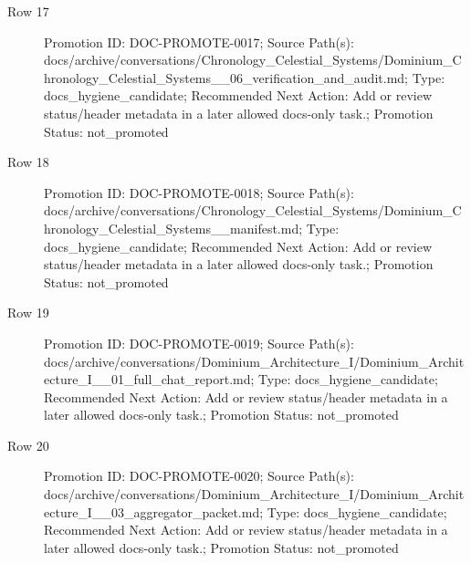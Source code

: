 \documentclass[9pt,a4paper,openany]{book}
\begin{document}
\begin{description}
\item[Row 17] Promotion ID: DOC-\allowbreak{}PROMOTE-\allowbreak{}0017; Source Path(s): docs/\allowbreak{}archive/\allowbreak{}conversations/\allowbreak{}Chronology\_\allowbreak{}Celestial\_\allowbreak{}Systems/\allowbreak{}Dominium\_\allowbreak{}Chronology\_\allowbreak{}Celestial\_\allowbreak{}Systems\_\allowbreak{}\_\allowbreak{}06\_\allowbreak{}verification\_\allowbreak{}and\_\allowbreak{}audit.\allowbreak{}md; Type: docs\_\allowbreak{}hygiene\_\allowbreak{}candidate; Recommended Next Action: Add or review status/\allowbreak{}header metadata in a later allowed docs-\allowbreak{}only task.\allowbreak{}; Promotion Status: not\_\allowbreak{}promoted
\item[Row 18] Promotion ID: DOC-\allowbreak{}PROMOTE-\allowbreak{}0018; Source Path(s): docs/\allowbreak{}archive/\allowbreak{}conversations/\allowbreak{}Chronology\_\allowbreak{}Celestial\_\allowbreak{}Systems/\allowbreak{}Dominium\_\allowbreak{}Chronology\_\allowbreak{}Celestial\_\allowbreak{}Systems\_\allowbreak{}\_\allowbreak{}manifest.\allowbreak{}md; Type: docs\_\allowbreak{}hygiene\_\allowbreak{}candidate; Recommended Next Action: Add or review status/\allowbreak{}header metadata in a later allowed docs-\allowbreak{}only task.\allowbreak{}; Promotion Status: not\_\allowbreak{}promoted
\item[Row 19] Promotion ID: DOC-\allowbreak{}PROMOTE-\allowbreak{}0019; Source Path(s): docs/\allowbreak{}archive/\allowbreak{}conversations/\allowbreak{}Dominium\_\allowbreak{}Architecture\_\allowbreak{}I/\allowbreak{}Dominium\_\allowbreak{}Architecture\_\allowbreak{}I\_\allowbreak{}\_\allowbreak{}01\_\allowbreak{}full\_\allowbreak{}chat\_\allowbreak{}report.\allowbreak{}md; Type: docs\_\allowbreak{}hygiene\_\allowbreak{}candidate; Recommended Next Action: Add or review status/\allowbreak{}header metadata in a later allowed docs-\allowbreak{}only task.\allowbreak{}; Promotion Status: not\_\allowbreak{}promoted
\item[Row 20] Promotion ID: DOC-\allowbreak{}PROMOTE-\allowbreak{}0020; Source Path(s): docs/\allowbreak{}archive/\allowbreak{}conversations/\allowbreak{}Dominium\_\allowbreak{}Architecture\_\allowbreak{}I/\allowbreak{}Dominium\_\allowbreak{}Architecture\_\allowbreak{}I\_\allowbreak{}\_\allowbreak{}03\_\allowbreak{}aggregator\_\allowbreak{}packet.\allowbreak{}md; Type: docs\_\allowbreak{}hygiene\_\allowbreak{}candidate; Recommended Next Action: Add or review status/\allowbreak{}header metadata in a later allowed docs-\allowbreak{}only task.\allowbreak{}; Promotion Status: not\_\allowbreak{}promoted

\end{description}
\end{document}
